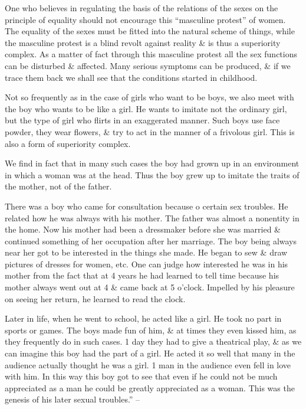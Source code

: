 \documentclass{article}
\numberwithin{equation}{section}
\begin{document}
One who believes in regulating the basis of the relations of the sexes on the principle of equality should not encourage this ``masculine protest'' of women. The equality of the sexes must be fitted into the natural scheme of things, while the masculine protest is a blind revolt against reality \& is thus a superiority complex. As a matter of fact through this masculine protest all the sex functions can be disturbed \& affected. Many serious symptoms can be produced, \& if we trace them back we shall see that the conditions started in childhood.

Not so frequently as in the case of girls who want to be boys, we also meet with the boy who wants to be like a girl. He wants to imitate not the ordinary girl, but the type of girl who flirts in an exaggerated manner. Such boys use face powder, they wear flowers, \& try to act in the manner of a frivolous girl. This is also a form of superiority complex.

We find in fact that in many such cases the boy had grown up in an environment in which a woman was at the head. Thus the boy grew up to imitate the traits of the mother, not of the father.

There was a boy who came for consultation because o certain sex troubles. He related how he was always with his mother. The father was almost a nonentity in the home. Now his mother had been a dressmaker before she was married \& continued something of her occupation after her marriage. The boy being always near her got to be interested in the things she made. He began to sew \& draw pictures of dresses for women, etc. One can judge how interested he was in his mother from the fact  that at 4 years he had learned to tell time because his mother always went out at 4 \& came back at 5 o'clock. Impelled by his pleasure on seeing her return, he learned to read the clock.

Later in life, when he went to school, he acted like a girl. He took no part in sports or games. The boys made fun of him, \& at times they even kissed him, as they frequently do in such cases. 1 day they had to give a theatrical play, \& as we can imagine this boy had the part of a girl. He acted it so well that many in the audience actually thought he was a girl. 1 man in the audience even fell in love with him. In this way this boy got to see that even if he could not be much appreciated as a man he could be greatly appreciated as a woman. This was the genesis of his later sexual troubles.'' -- \cite[pp. 135--153]{Adler2013}
\end{document}
